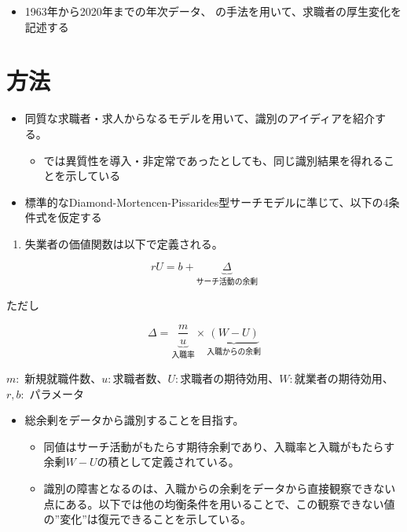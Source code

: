 \documentclass[
]{book}
\providecommand{\tightlist}{%
  \setlength{\itemsep}{0pt}\setlength{\parskip}{0pt}}
\begin{document}
\begin{itemize}
\tightlist
\item
  1963年から2020年までの年次データ、\citet{kawata2021first} の手法を用いて、求職者の厚生変化を記述する
\end{itemize}

\hypertarget{ux65b9ux6cd5-1}{%
\section{方法}\label{ux65b9ux6cd5-1}}

\begin{itemize}
\item
  同質な求職者・求人からなるモデルを用いて、識別のアイディアを紹介する。

  \begin{itemize}
  \tightlist
  \item
    \citet{kawata2021first} では異質性を導入・非定常であったとしても、同じ識別結果を得れることを示している
  \end{itemize}
\item
  標準的なDiamond-Mortencen-Pissarides型サーチモデル\citep{rogerson2005search}に準じて、以下の4条件式を仮定する
\end{itemize}

\begin{enumerate}
\def\labelenumi{\arabic{enumi}.}
\tightlist
\item
  失業者の価値関数は以下で定義される。
\end{enumerate}

\[rU=b+\underbrace{\Delta}_{サーチ活動の余剰}\]

ただし

\[\Delta = \underbrace{\frac{m}{u}}_{入職率}\times \underbrace{(W-U)}_{入職からの余剰}\]

\(m:\) 新規就職件数、\(u:\)求職者数、\(U:\)求職者の期待効用、\(W:\)就業者の期待効用、\(r,b:\) パラメータ

\begin{itemize}
\item
  総余剰をデータから識別することを目指す。

  \begin{itemize}
  \item
    同値はサーチ活動がもたらす期待余剰であり、入職率と入職がもたらす余剰\(W-U\)の積として定義されている。
  \item
    識別の障害となるのは、入職からの余剰をデータから直接観察できない点にある。以下では他の均衡条件を用いることで、この観察できない値の''変化''は復元できることを示している。
  \end{itemize}
\end{itemize}
\end{document}
